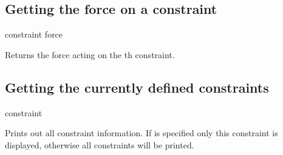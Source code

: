 \subsection{Getting the force on a constraint}
\begin{essyntax}
constraint force  
\end{essyntax}
Returns the force acting on the th constraint.


\subsection{Getting the currently defined constraints}
\begin{essyntax}
constraint   
\end{essyntax}
Prints out all constraint information. If  is specified only this
constraint is displayed, otherwise all constraints will be printed.

